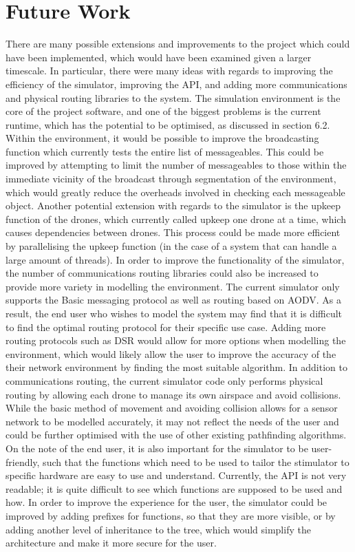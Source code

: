 	\section{Future Work}
There are many possible extensions and improvements to the project which could have been implemented, which would have been examined given a larger timescale. In particular, there were many ideas with regards to improving the efficiency of the simulator, improving the API, and adding more communications and physical routing libraries to the system.
The simulation environment is the core of the project software, and one of the biggest problems is the current runtime, which has the potential to be optimised, as discussed in section 6.2. Within the environment, it would be possible to improve the broadcasting function which currently tests the entire list of messageables. This could be improved by attempting to limit the number of messageables to those within the immediate vicinity of the broadcast through segmentation of the environment, which would greatly reduce the overheads involved in checking each messageable object. Another potential extension with regards to the simulator is the upkeep function of the drones, which currently called upkeep one drone at a time, which causes dependencies between drones. This process could be made more efficient by parallelising the upkeep function (in the case of a system that can handle a large amount of threads).
In order to improve the functionality of the simulator, the number of communications routing libraries could also be increased to provide more variety in modelling the environment. The current simulator only supports the Basic messaging protocol as well as routing based on AODV. As a result, the end user who wishes to model the system may find that it is difficult to find the optimal routing protocol for their specific use case. Adding more routing protocols such as DSR would allow for more options when modelling the environment, which would likely allow the user to improve the accuracy of the their network environment by finding the most suitable algorithm. In addition to communications routing, the current simulator code only performs physical routing by allowing each drone to manage its own airspace and avoid collisions. While the basic method of movement and avoiding collision allows for a sensor network to be modelled accurately, it may not reflect the needs of the user and could be further optimised with the use of other existing pathfinding algorithms.
On the note of the end user, it is also important for the simulator to be user-friendly, such that the functions which need to be used to tailor the stimulator to specific hardware are easy to use and understand. Currently, the API is not very readable; it is quite difficult to see which functions are supposed to be used and how. In order to improve the experience for the user, the simulator could be improved by adding prefixes for functions, so that they are more visible, or by adding another level of inheritance to the tree, which would simplify the architecture and make it more secure for the user.

